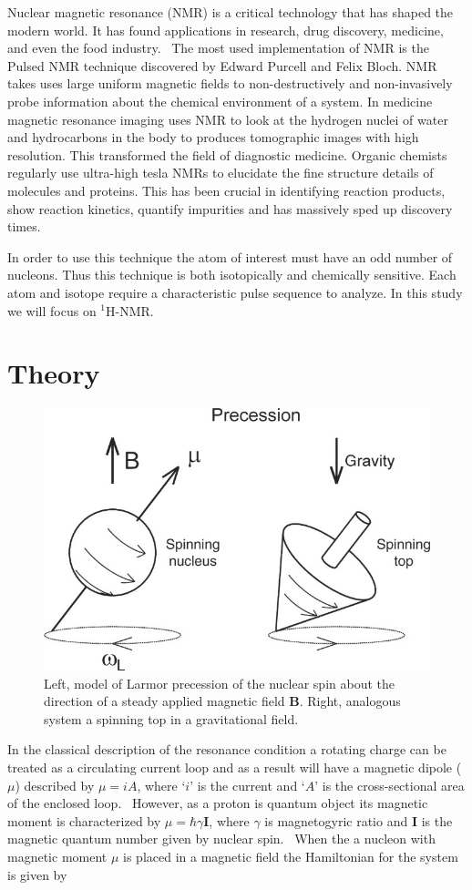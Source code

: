 \documentclass[
reprint,
amsmath,amssymb,
aps,
tikz,
border=5pt
]{revtex4-1}
\begin{document}
  Nuclear magnetic resonance (NMR) is a critical technology that has shaped the modern world. It has found applications in research, drug discovery, medicine, and even the food industry.~\cite{Labmate} The most used implementation of NMR is the Pulsed NMR technique discovered by Edward Purcell and Felix Bloch. NMR takes uses large uniform magnetic fields to non-destructively and non-invasively probe information about the chemical environment of a system. In medicine magnetic resonance imaging uses NMR to look at the hydrogen nuclei of water and hydrocarbons in the body to produces tomographic images with high resolution. This transformed the field of diagnostic medicine. Organic chemists regularly use ultra-high tesla NMRs to elucidate the fine structure details of molecules and proteins. This has been crucial in identifying reaction products, show reaction kinetics, quantify impurities and has massively sped up discovery times.  

 In order to use this technique the atom of interest must have an odd number of nucleons. Thus this technique is both isotopically and chemically sensitive. Each atom and isotope require a characteristic pulse sequence to analyze. In this study we will focus on $^1$H-NMR.


\section*{Theory}
  
\begin{figure}[b]
    \includegraphics[width = 0.45 \textwidth]{figures/lamor.jpg}
    \caption{Left, model of Larmor precession of the nuclear spin about the direction of a steady applied magnetic field \textbf{B}. Right, analogous system a spinning top in a gravitational field.~\cite{Prasad2008}}
    \label{fig:lamor}
\end{figure}

  In the classical description of the resonance condition a rotating charge can be treated as a circulating current loop and as a result will have a magnetic dipole ($\mu$) described by $\mu = iA$, where `$i$' is the current and `$A$' is the cross-sectional area of the enclosed loop.~\cite{nmr65} However, as a proton is quantum object its magnetic moment is characterized by $\mu = \hbar \gamma \mathbf{I}$, where $\gamma$ is magnetogyric ratio and \textbf{I} is the magnetic quantum number given by nuclear spin.~\cite{nmr65}  When the a nucleon with magnetic moment $\mu$ is placed in a magnetic field the Hamiltonian for the system is given by
\end{document}
